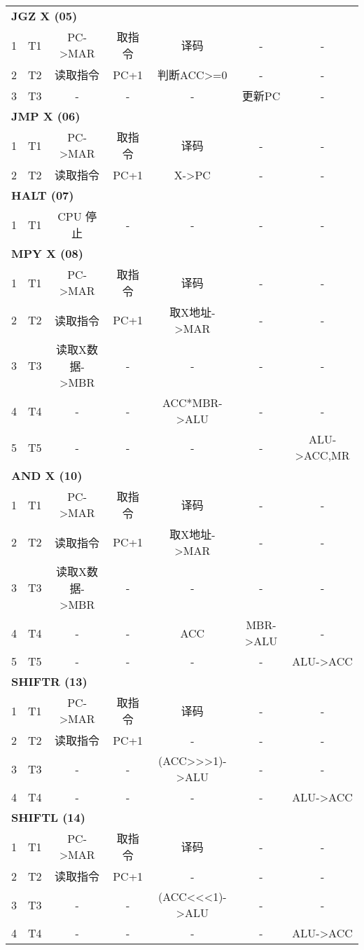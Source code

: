 \documentclass[lang=cn,a4paper,newtx]{elegantpaper}
\begin{document}
\begin{longtable}{c c c c c c c}
  \multicolumn{7}{l}{\textbf{JGZ X (05)}} \\
  1 & T1 & PC->MAR & 取指令 & 译码 & - & - \\
  2 & T2 & 读取指令 & PC+1 & 判断ACC>=0 & - & - \\
  3 & T3 & - & - & - & 更新PC & - \\

  \multicolumn{7}{l}{\textbf{JMP X (06)}} \\
  1 & T1 & PC->MAR & 取指令 & 译码 & - & - \\
  2 & T2 & 读取指令 & PC+1 & X->PC & - & - \\

  \multicolumn{7}{l}{\textbf{HALT (07)}} \\
  1 & T1 & CPU 停止 & - & - & - & - \\

  \multicolumn{7}{l}{\textbf{MPY X (08)}} \\
  1 & T1 & PC->MAR & 取指令 & 译码 & - & - \\
  2 & T2 & 读取指令 & PC+1 & 取X地址->MAR & - & - \\
  3 & T3 & 读取X数据->MBR & - & - & - & - \\
  4 & T4 & - & - & ACC*MBR->ALU & - & - \\
  5 & T5 & - & - & - & - & ALU->ACC,MR \\

  \multicolumn{7}{l}{\textbf{AND X (10)}} \\
  1 & T1 & PC->MAR & 取指令 & 译码 & - & - \\
  2 & T2 & 读取指令 & PC+1 & 取X地址->MAR & - & - \\
  3 & T3 & 读取X数据->MBR & - & - & - & - \\
  4 & T4 & - & - & ACC & MBR->ALU & - \\
  5 & T5 & - & - & - & - & ALU->ACC \\

  \multicolumn{7}{l}{\textbf{SHIFTR (13)}} \\
  1 & T1 & PC->MAR & 取指令 & 译码 & - & - \\
  2 & T2 & 读取指令 & PC+1 & - & - & - \\
  3 & T3 & - & - & (ACC>>>1)->ALU & - & - \\
  4 & T4 & - & - & - & - & ALU->ACC \\

  \multicolumn{7}{l}{\textbf{SHIFTL (14)}} \\
  1 & T1 & PC->MAR & 取指令 & 译码 & - & - \\
  2 & T2 & 读取指令 & PC+1 & - & - & - \\
  3 & T3 & - & - & (ACC<<<1)->ALU & - & - \\
  4 & T4 & - & - & - & - & ALU->ACC \\

\end{longtable}
\end{document}
